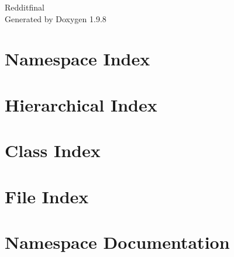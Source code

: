 \documentclass[twoside]{book}
\newcommand{\+}{\discretionary{\mbox{\scriptsize$\hookleftarrow$}}{}{}}
\newcommand{\clearemptydoublepage}{%
    \newpage{\pagestyle{empty}\cleardoublepage}%
  }
\begin{document}
  \raggedbottom
    \hypersetup{pageanchor=false,
                bookmarksnumbered=true,
                pdfencoding=unicode
               }
  \begin{titlepage}
  \vspace*{7cm}
  \begin{center}%
  {\Large Redditfinal}\\
  \vspace*{1cm}
  {\large Generated by Doxygen 1.9.8}\\
  \end{center}
  \end{titlepage}
  \clearemptydoublepage
  \tableofcontents
  \clearemptydoublepage
  \hypersetup{pageanchor=true}

\chapter{Namespace Index}

\chapter{Hierarchical Index}

\chapter{Class Index}

\chapter{File Index}

\chapter{Namespace Documentation}

























\end{document}
